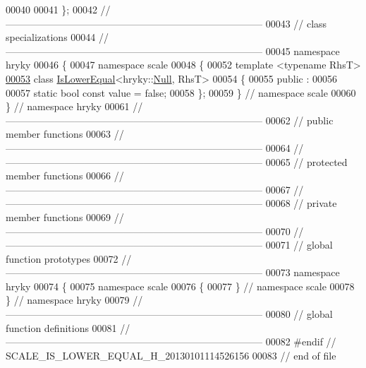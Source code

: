 \begin{DoxyCode}
00040 
00041 \};
00042 \textcolor{comment}{//
      ------------------------------------------------------------------------------}
00043 \textcolor{comment}{// class specializations}
00044 \textcolor{comment}{//
      ------------------------------------------------------------------------------}
00045 \textcolor{keyword}{namespace }hryky
00046 \{
00047 \textcolor{keyword}{namespace }scale
00048 \{
00052 \textcolor{keyword}{template} <\textcolor{keyword}{typename} RhsT>
\hypertarget{scale__is__lower__equal_8h_source_l00053}{}\hyperlink{classhryky_1_1scale_1_1_is_lower_equal_3_01hryky_1_1_null_00_01_rhs_t_01_4}{00053} \textcolor{keyword}{class }\hyperlink{classhryky_1_1scale_1_1_is_lower_equal}{IsLowerEqual}<hryky::\hyperlink{classhryky_1_1_null}{Null}, RhsT>
00054 \{
00055 \textcolor{keyword}{public} :
00056 
00057     \textcolor{keyword}{static} \textcolor{keywordtype}{bool} \textcolor{keyword}{const} value = \textcolor{keyword}{false};
00058 \};
00059 \} \textcolor{comment}{// namespace scale}
00060 \} \textcolor{comment}{// namespace hryky}
00061 \textcolor{comment}{//
      ------------------------------------------------------------------------------}
00062 \textcolor{comment}{// public member functions}
00063 \textcolor{comment}{//
      ------------------------------------------------------------------------------}
00064 \textcolor{comment}{//
      ------------------------------------------------------------------------------}
00065 \textcolor{comment}{// protected member functions}
00066 \textcolor{comment}{//
      ------------------------------------------------------------------------------}
00067 \textcolor{comment}{//
      ------------------------------------------------------------------------------}
00068 \textcolor{comment}{// private member functions}
00069 \textcolor{comment}{//
      ------------------------------------------------------------------------------}
00070 \textcolor{comment}{//
      ------------------------------------------------------------------------------}
00071 \textcolor{comment}{// global function prototypes}
00072 \textcolor{comment}{//
      ------------------------------------------------------------------------------}
00073 \textcolor{keyword}{namespace }hryky
00074 \{
00075 \textcolor{keyword}{namespace }scale
00076 \{
00077 \} \textcolor{comment}{// namespace scale}
00078 \} \textcolor{comment}{// namespace hryky}
00079 \textcolor{comment}{//
      ------------------------------------------------------------------------------}
00080 \textcolor{comment}{// global function definitions}
00081 \textcolor{comment}{//
      ------------------------------------------------------------------------------}
00082 \textcolor{preprocessor}{#endif // SCALE\_IS\_LOWER\_EQUAL\_H\_20130101114526156}
00083 \textcolor{preprocessor}{}\textcolor{comment}{// end of file}
\end{DoxyCode}

